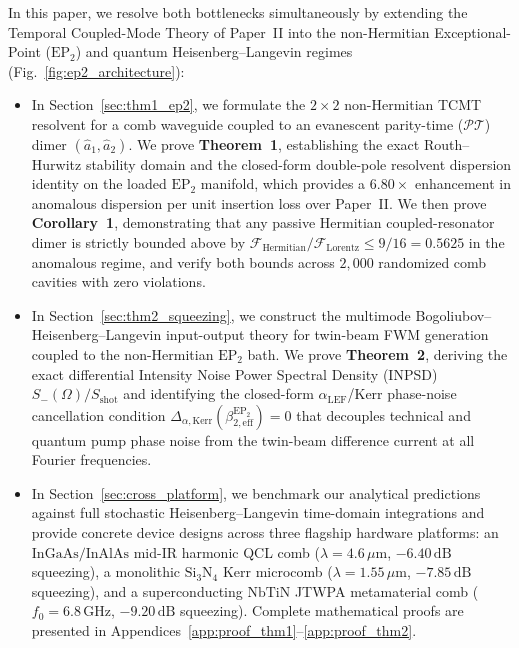 \documentclass[11pt,letterpaper]{article}
\theoremstyle{definition}
\theoremstyle{remark}
\begin{document}
In this paper, we resolve both bottlenecks simultaneously by extending the Temporal Coupled-Mode Theory of Paper~II into the non-Hermitian Exceptional-Point ($\mathrm{EP}_2$) and quantum Heisenberg--Langevin regimes (Fig.~\ref{fig:ep2_architecture}):
\begin{itemize}
    \item In Section~\ref{sec:thm1_ep2}, we formulate the $2\times 2$ non-Hermitian TCMT resolvent for a comb waveguide coupled to an evanescent parity-time ($\mathcal{PT}$) dimer $(\hat{a}_1, \hat{a}_2)$. We prove \textbf{Theorem~1}, establishing the exact Routh--Hurwitz stability domain and the closed-form double-pole resolvent dispersion identity on the loaded $\mathrm{EP}_2$ manifold, which provides a $6.80\times$ enhancement in anomalous dispersion per unit insertion loss over Paper~II. We then prove \textbf{Corollary~1}, demonstrating that any passive Hermitian coupled-resonator dimer is strictly bounded above by $\mathcal{F}_{\mathrm{Hermitian}}/\mathcal{F}_{\mathrm{Lorentz}} \le 9/16 = 0.5625$ in the anomalous regime, and verify both bounds across $2{,}000$ randomized comb cavities with zero violations.
    \item In Section~\ref{sec:thm2_squeezing}, we construct the multimode Bogoliubov--Heisenberg--Langevin input-output theory for twin-beam FWM generation coupled to the non-Hermitian $\mathrm{EP}_2$ bath. We prove \textbf{Theorem~2}, deriving the exact differential Intensity Noise Power Spectral Density (INPSD) $S_-(\Omega)/S_{\mathrm{shot}}$ and identifying the closed-form $\alpha_{\mathrm{LEF}}$/Kerr phase-noise cancellation condition $\Delta_{\alpha,\mathrm{Kerr}}(\beta_{2,\mathrm{eff}}^{\mathrm{EP}_2}) = 0$ that decouples technical and quantum pump phase noise from the twin-beam difference current at all Fourier frequencies.
    \item In Section~\ref{sec:cross_platform}, we benchmark our analytical predictions against full stochastic Heisenberg--Langevin time-domain integrations and provide concrete device designs across three flagship hardware platforms: an $\mathrm{InGaAs/InAlAs}$ mid-IR harmonic QCL comb ($\lambda = 4.6\,\mu\mathrm{m}$, $-6.40\,\mathrm{dB}$ squeezing), a monolithic $\mathrm{Si_3N_4}$ Kerr microcomb ($\lambda = 1.55\,\mu\mathrm{m}$, $-7.85\,\mathrm{dB}$ squeezing), and a superconducting $\mathrm{NbTiN}$ JTWPA metamaterial comb ($f_0 = 6.8\,\mathrm{GHz}$, $-9.20\,\mathrm{dB}$ squeezing). Complete mathematical proofs are presented in Appendices~\ref{app:proof_thm1}--\ref{app:proof_thm2}.
\end{itemize}
\end{document}
